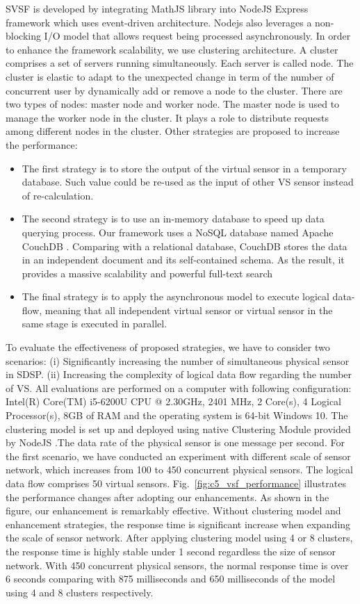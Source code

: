 SVSF is developed by integrating MathJS library into NodeJS Express framework  which uses event-driven architecture. Nodejs also leverages a non-blocking I/O model that allows request being processed asynchronously. In order to enhance the framework scalability, we use clustering architecture. A cluster comprises a set of servers running simultaneously. Each server is called node. The cluster is elastic to adapt to the unexpected change in term of the number of concurrent user by dynamically add or remove a node to the cluster. There are two types of nodes: master node and worker node. The master node is used to manage the worker node in the cluster. It plays a role to distribute requests among different nodes in the cluster. Other strategies are proposed to increase the performance:
\begin{itemize}
    \item The first strategy is to store the output of the virtual sensor in a temporary database. Such value could be re-used as the input of other VS sensor instead of re-calculation.
    \item The second strategy is to use an in-memory database  to speed up data querying process. Our framework uses a NoSQL database named Apache CouchDB . Comparing with a relational database, CouchDB stores the data in an independent document and its self-contained schema. As the result, it provides a massive scalability and powerful full-text search
    \item The final strategy is to apply the asynchronous model to execute logical data-flow, meaning that all independent virtual sensor or virtual sensor in the same stage is executed in parallel.
\end{itemize}
To evaluate the effectiveness of proposed strategies, we have to consider two scenarios: (i) Significantly increasing the number of simultaneous physical sensor in SDSP. (ii) Increasing the complexity of logical data flow regarding the number of VS. All evaluations are performed on a computer with following configuration: Intel(R) Core(TM) i5-6200U CPU @ 2.30GHz, 2401 MHz, 2 Core(s), 4 Logical Processor(s), 8GB of RAM and the operating system is 64-bit Windows 10. The clustering model is set up and deployed using native Clustering Module  provided by NodeJS .The data rate of the physical sensor is one message per second. For the first scenario, we have conducted an experiment with different scale of sensor network, which increases from 100 to 450 concurrent physical sensors. The logical data flow comprises 50 virtual sensors. Fig.~\ref{fig:c5_vsf_performance} illustrates the performance changes after adopting our enhancements. As shown in the figure, our enhancement is remarkably effective. Without clustering model and enhancement strategies, the response time is significant increase when expanding the scale of sensor network. After applying clustering model using 4 or 8 clusters, the response time is highly stable under 1 second regardless the size of sensor network. With 450 concurrent physical sensors, the normal response time is over 6 seconds comparing with 875 milliseconds and 650 milliseconds of the model using 4 and 8 clusters respectively.\\

